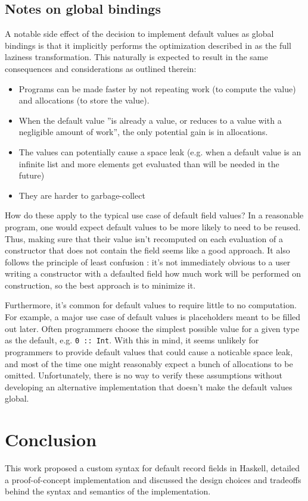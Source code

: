 \documentclass[en]{pracamgr}
\begin{document}
\section{Notes on global bindings}
\label{sec:efficiency}
A notable side effect of the decision to implement default values as global bindings is that it implicitly performs the optimization
described in \cite{partain1996let-floating} as the full laziness transformation. 
This naturally is expected to result in the same consequences and considerations as outlined therein:
\begin{itemize}
  \item Programs can be made faster by not repeating work (to compute the value) and allocations (to store the value).
  \item When the default value ''is already a value, or reduces to a value with a negligible amount of work'', the only potential gain is in allocations.
  \item The values can potentially cause a space leak 
    (e.g. when a default value is an infinite list and more elements get evaluated than will be needed in the future)
  \item They are harder to garbage-collect
\end{itemize}
How do these apply to the typical use case of default field values?
In a reasonable program, one would expect default values to be more likely to need to be reused.
Thus, making sure that their value isn't recomputed on each evaluation of a constructor that does not contain the field seems like a good approach.
It also follows the principle of least confusion \cite{saltzer2009principles}: 
it's not immediately obvious to a user writing a constructor with a defaulted field how much work will be performed on construction,
so the best approach is to minimize it.

Furthermore, it's common for default values to require little to no computation. 
For example, a major use case of default values is placeholders meant to be filled out later. 
Often programmers choose the simplest possible value for a given type as the default, e.g. \texttt{0\ ::\ Int}.
With this in mind, it seems unlikely for programmers to provide default values that could cause a noticable space leak, and most of the time one might
reasonably expect a bunch of allocations to be omitted.
Unfortunately, there is no way to verify these assumptions without developing an alternative implementation that doesn't make the default values global.

\chapter{Conclusion} 
This work proposed a custom syntax for default record fields in Haskell, detailed a proof-of-concept implementation and discussed the design choices
and tradeoffs behind the syntax and semantics of the implementation.
\end{document}
